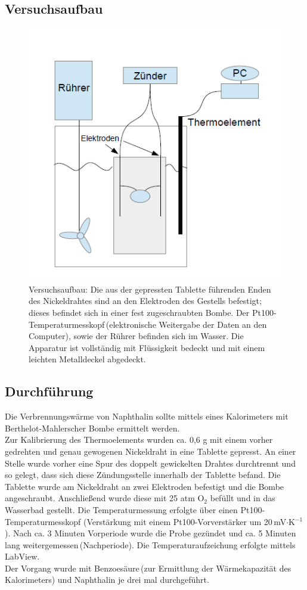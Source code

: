 \documentclass[12pt,a4paper,titlepage,headinclude,bibtotoc]{scrartcl}
\begin{document}
\subsection{Versuchsaufbau}
\begin{figure} [ht!]
\begin{center}
\includegraphics[scale=0.9]{Versuchsaufbau.png} \end{center}
\caption{Versuchsaufbau: Die aus der gepressten Tablette führenden Enden des Nickeldrahtes sind an den Elektroden des Gestells befestigt; dieses befindet sich in einer fest zugeschraubten Bombe. Der Pt100-Temperaturmesskopf\,(elektronische Weitergabe der Daten an den Computer), sowie der Rührer befinden sich im Wasser. Die Apparatur ist vollständig mit Flüssigkeit bedeckt und mit einem leichten Metalldeckel abgedeckt.}
\end{figure}

\subsection{Durchführung}
Die Verbrennungswärme von Naphthalin sollte mittels eines Kalorimeters mit Berthelot-Mahlerscher Bombe ermittelt werden.\\
Zur Kalibrierung des Thermoelements wurden ca. 0,6 g mit einem vorher gedrehten und genau gewogenen Nickeldraht in eine Tablette gepresst. An einer Stelle wurde vorher eine Spur des doppelt gewickelten Drahtes durchtrennt und so gelegt, dass sich diese Zündungsstelle innerhalb der Tablette befand. Die Tablette wurde am Nickeldraht an zwei Elektroden befestigt und die Bombe angeschraubt. Anschließend wurde diese mit 25 atm O$_2$ befüllt und in das Wasserbad gestellt.  Die Temperaturmessung erfolgte über einen Pt100-\,Temperaturmesskopf (Verstärkung mit einem Pt100-Vorverstärker um 20\,mV$\cdot$K$^{-1}$). Nach ca. 3 Minuten Vorperiode wurde die Probe gezündet und ca. 5 Minuten lang weitergemessen\,(Nachperiode).
Die Temperaturaufzeichung erfolgte mittels LabView.\\
Der Vorgang wurde mit Benzoesäure\,(zur Ermittlung der Wärmekapazität des Kalorimeters) und Naphthalin je drei mal durchgeführt.\\ 
\end{document}
